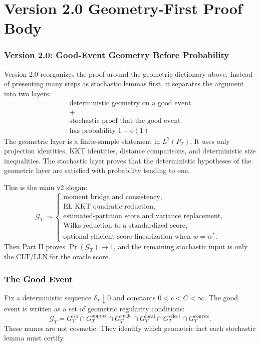 \documentclass[12pt]{article}
\numberwithin{equation}{section}
\theoremstyle{definition}
\begin{document}
\part{Version 2.0 Geometry-First Proof Body}

\section{Version 2.0: Good-Event Geometry Before Probability}

Version 2.0 reorganizes the proof around the geometric dictionary above. Instead
of presenting many steps as stochastic lemmas first, it separates the argument
into two layers:
\[
\begin{array}{c}
    \text{deterministic geometry on a good event}\\[3pt]
    +\\[3pt]
    \text{stochastic proof that the good event}\\
    \text{has probability }1-o(1)
\end{array}
\]
The geometric layer is a finite-sample statement in \(L^2(P_T)\). It uses only
projection identities, KKT identities, distance comparisons, and deterministic
size inequalities. The stochastic layer proves that the deterministic hypotheses
of the geometric layer are satisfied with probability tending to one.

This is the main v2 slogan:
\[
    \mathcal G_T
    \Longrightarrow
    \left\{
    \begin{array}{l}
    \text{moment bridge and consistency},\\
    \text{EL KKT quadratic reduction},\\
    \text{estimated-partition score and variance replacement},\\
    \text{Wilks reduction to a standardized score},\\
    \text{optional efficient-score linearization when }w=w^*.
    \end{array}
    \right.
\]
Then Part II proves \(\Pr(\mathcal G_T)\to1\), and the remaining stochastic
input is only the CLT/LLN for the oracle score.

\section{The Good Event}

Fix a deterministic sequence \(\delta_T\downarrow0\) and constants
\(0<c<C<\infty\). The good event is written as a set of geometric regularity
conditions:
\[
    \mathcal G_T
    =G_T^{\mathrm{iso}}
     \cap G_T^{\mathrm{approx}}
     \cap G_T^{\mathrm{angle}}
     \cap G_T^{\mathrm{local}}
     \cap G_T^{\mathrm{select}}
     \cap G_T^{\mathrm{convex}}.
\]
These names are not cosmetic. They identify which geometric fact each
stochastic lemma must certify.
\end{document}
